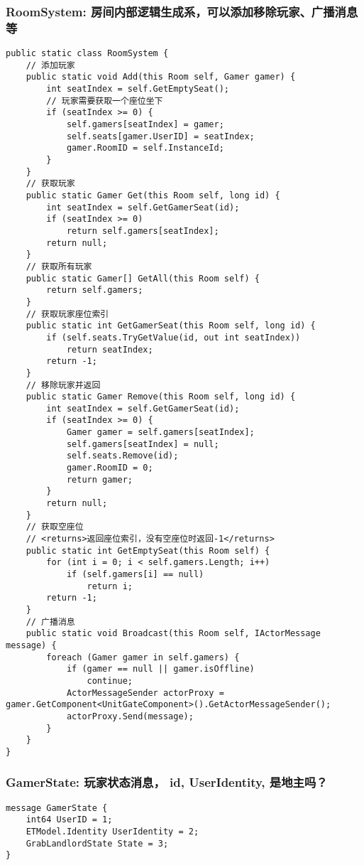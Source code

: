 \documentclass[9pt, b5paper]{article}
\begin{document}
\subsubsection{RoomSystem: 房间内部逻辑生成系，可以添加移除玩家、广播消息等}
\label{sec-1-6-2}
\begin{verbatim}
public static class RoomSystem {
    // 添加玩家
    public static void Add(this Room self, Gamer gamer) {
        int seatIndex = self.GetEmptySeat();
        // 玩家需要获取一个座位坐下
        if (seatIndex >= 0) {
            self.gamers[seatIndex] = gamer;
            self.seats[gamer.UserID] = seatIndex;
            gamer.RoomID = self.InstanceId;
        }
    }
    // 获取玩家
    public static Gamer Get(this Room self, long id) {
        int seatIndex = self.GetGamerSeat(id);
        if (seatIndex >= 0) 
            return self.gamers[seatIndex];
        return null;
    }
    // 获取所有玩家
    public static Gamer[] GetAll(this Room self) {
        return self.gamers;
    }
    // 获取玩家座位索引
    public static int GetGamerSeat(this Room self, long id) {
        if (self.seats.TryGetValue(id, out int seatIndex)) 
            return seatIndex;
        return -1;
    }
    // 移除玩家并返回
    public static Gamer Remove(this Room self, long id) {
        int seatIndex = self.GetGamerSeat(id);
        if (seatIndex >= 0) {
            Gamer gamer = self.gamers[seatIndex];
            self.gamers[seatIndex] = null;
            self.seats.Remove(id);
            gamer.RoomID = 0;
            return gamer;
        }
        return null;
    }
    // 获取空座位
    // <returns>返回座位索引，没有空座位时返回-1</returns>
    public static int GetEmptySeat(this Room self) {
        for (int i = 0; i < self.gamers.Length; i++) 
            if (self.gamers[i] == null) 
                return i;
        return -1;
    }
    // 广播消息
    public static void Broadcast(this Room self, IActorMessage message) {
        foreach (Gamer gamer in self.gamers) {
            if (gamer == null || gamer.isOffline) 
                continue;
            ActorMessageSender actorProxy = gamer.GetComponent<UnitGateComponent>().GetActorMessageSender();
            actorProxy.Send(message);
        }
    }
}
\end{verbatim}
\subsubsection{GamerState: 玩家状态消息， id, UserIdentity, 是地主吗？}
\label{sec-1-6-3}
\begin{verbatim}
message GamerState {
    int64 UserID = 1;
    ETModel.Identity UserIdentity = 2;
	GrabLandlordState State = 3;
}
\end{verbatim}
\end{document}
